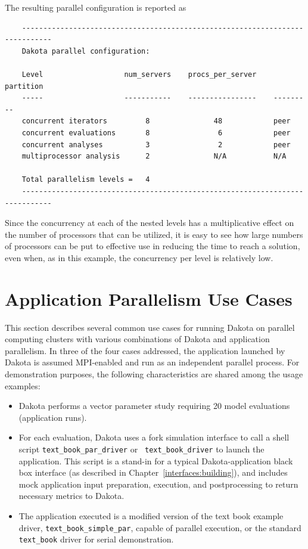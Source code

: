 The resulting parallel configuration is reported as
\begin{small}
\begin{verbatim}
    -----------------------------------------------------------------------------
    Dakota parallel configuration:

    Level                   num_servers    procs_per_server    partition
    -----                   -----------    ----------------    ---------
    concurrent iterators         8               48            peer
    concurrent evaluations       8                6            peer
    concurrent analyses          3                2            peer
    multiprocessor analysis      2               N/A           N/A

    Total parallelism levels =   4
    -----------------------------------------------------------------------------
\end{verbatim}
\end{small}

Since the concurrency at each of the nested levels has a
multiplicative effect on the number of processors that can be
utilized, it is easy to see how large numbers of processors can be put
to effective use in reducing the time to reach a solution, even when,
as in this example, the concurrency per level is relatively low.


\section{Application Parallelism Use Cases}\label{parallel:application}

This section describes several common use cases for running Dakota on
parallel computing clusters with various combinations of Dakota and
application parallelism.  In three of the four cases addressed, the
application launched by Dakota is assumed MPI-enabled and run as an
independent parallel process.  For demonstration purposes, the
following characteristics are shared among the usage examples:
\begin{itemize}
\item Dakota performs a vector parameter study requiring 20 model
evaluations (application runs).

\item For each evaluation, Dakota uses a fork simulation interface to
call a shell script {\tt text\_book\_par\_driver} or {\tt
text\_book\_driver} to launch the application.  This script is a
stand-in for a typical Dakota-application black box interface (as
described in Chapter~\ref{interfaces:building}), and includes mock
application input preparation, execution, and postprocessing to return
necessary metrics to Dakota.

\item The application executed is a modified version of the text book
example driver, {\tt text\_book\_simple\_par}, capable of parallel
execution, or the standard {\tt text\_book} driver for serial
demonstration.
\end{itemize}

